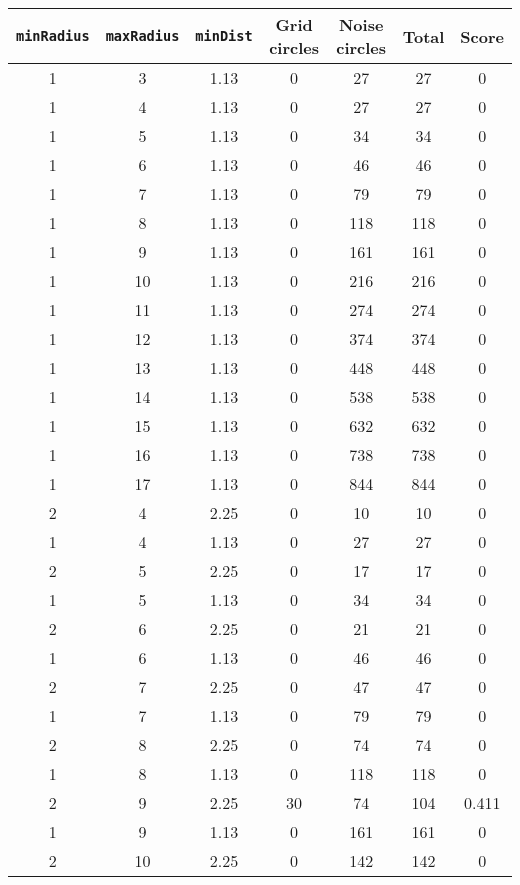 \documentclass[letterpaper, 12pt]{article}
\begin{document}
\begin{longtable}{|c|c|c|c|c|c|c|}
\hline
\textbf{\texttt{minRadius}} & \textbf{\texttt{maxRadius}} & \textbf{\texttt{minDist}} & \textbf{Grid circles} & \textbf{Noise circles} & \textbf{Total} & \textbf{Score} \\
\hline
1 & 3 & 1.13 & 0 & 27 & 27 & 0 \\
\hline
1 & 4 & 1.13 & 0 & 27 & 27 & 0 \\
\hline
1 & 5 & 1.13 & 0 & 34 & 34 & 0 \\
\hline
1 & 6 & 1.13 & 0 & 46 & 46 & 0 \\
\hline
1 & 7 & 1.13 & 0 & 79 & 79 & 0 \\
\hline
1 & 8 & 1.13 & 0 & 118 & 118 & 0 \\
\hline
1 & 9 & 1.13 & 0 & 161 & 161 & 0 \\
\hline
1 & 10 & 1.13 & 0 & 216 & 216 & 0 \\
\hline
1 & 11 & 1.13 & 0 & 274 & 274 & 0 \\
\hline
1 & 12 & 1.13 & 0 & 374 & 374 & 0 \\
\hline
1 & 13 & 1.13 & 0 & 448 & 448 & 0 \\
\hline
1 & 14 & 1.13 & 0 & 538 & 538 & 0 \\
\hline
1 & 15 & 1.13 & 0 & 632 & 632 & 0 \\
\hline
1 & 16 & 1.13 & 0 & 738 & 738 & 0 \\
\hline
1 & 17 & 1.13 & 0 & 844 & 844 & 0 \\
\hline
2 & 4 & 2.25 & 0 & 10 & 10 & 0 \\
\hline
1 & 4 & 1.13 & 0 & 27 & 27 & 0 \\
\hline
2 & 5 & 2.25 & 0 & 17 & 17 & 0 \\
\hline
1 & 5 & 1.13 & 0 & 34 & 34 & 0 \\
\hline
2 & 6 & 2.25 & 0 & 21 & 21 & 0 \\
\hline
1 & 6 & 1.13 & 0 & 46 & 46 & 0 \\
\hline
2 & 7 & 2.25 & 0 & 47 & 47 & 0 \\
\hline
1 & 7 & 1.13 & 0 & 79 & 79 & 0 \\
\hline
2 & 8 & 2.25 & 0 & 74 & 74 & 0 \\
\hline
1 & 8 & 1.13 & 0 & 118 & 118 & 0 \\
\hline
2 & 9 & 2.25 & 30 & 74 & 104 & 0.411 \\
\hline
1 & 9 & 1.13 & 0 & 161 & 161 & 0 \\
\hline
2 & 10 & 2.25 & 0 & 142 & 142 & 0 \\

\end{longtable}
\end{document}
